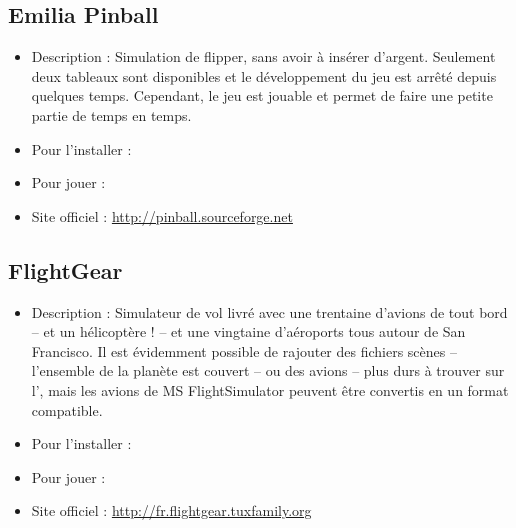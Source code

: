 \subsection{Emilia Pinball}
\begin{itemize}
\begingroup
{}
\item Description : Simulation de flipper, sans avoir à insérer d'argent. Seulement deux tableaux sont disponibles et le développement du jeu est arrêté depuis quelques temps. Cependant, le jeu est jouable et permet de faire une petite partie de temps en temps.{\par}
\item Pour l'installer : 
\item Pour jouer : 
\item Site officiel : \url{http://pinball.sourceforge.net}{\par}
\endgroup
\end{itemize} 
\subsection{FlightGear}
\begin{itemize}
\begingroup
{}
\item Description : Simulateur de vol livré avec une trentaine d'avions de tout bord -- et un hélicoptère ! -- et une vingtaine d'aéroports tous autour de San Francisco. Il est évidemment possible de rajouter des fichiers scènes -- l'ensemble de la planète est couvert -- ou des avions -- plus durs à trouver sur l', mais les avions de MS FlightSimulator peuvent être convertis en un format compatible.{\par}
\item Pour l'installer : 
\item Pour jouer : 
\item Site officiel : \url{http://fr.flightgear.tuxfamily.org}{\par}
\endgroup
\end{itemize}
